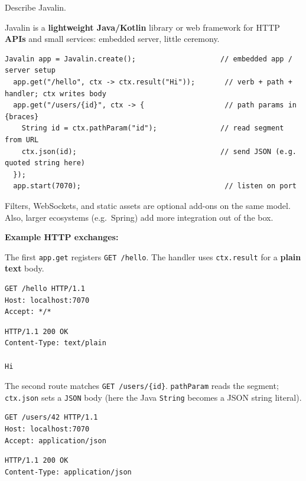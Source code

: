 \question[4]
Describe Javalin.
\begin{solutionorbox}[1.00in]
  Javalin is a \textbf{lightweight Java/Kotlin} library or web framework for HTTP \textbf{APIs} and small services: embedded server, little ceremony.

  \begin{lstlisting}[style=java]
  Javalin app = Javalin.create();                    // embedded app / server setup
  app.get("/hello", ctx -> ctx.result("Hi"));       // verb + path + handler; ctx writes body
  app.get("/users/{id}", ctx -> {                   // path params in {braces}
    String id = ctx.pathParam("id");               // read segment from URL
    ctx.json(id);                                  // send JSON (e.g. quoted string here)
  });
  app.start(7070);                                  // listen on port
  \end{lstlisting}
  Filters, WebSockets, and static assets are optional add-ons on the same model. Also, larger ecosystems (e.g.\ Spring) add more integration out of the box. 

  \noindent\textbf{Example HTTP exchanges:}\par
  \noindent The first \texttt{app.get} registers \texttt{GET /hello}. The handler uses \texttt{ctx.result} for a \textbf{plain text} body.\par
  \begin{httpexchange}
\begin{lstlisting}[style=http]
GET /hello HTTP/1.1
Host: localhost:7070
Accept: */*

\end{lstlisting}
\httpmidarrows
\begin{lstlisting}[style=http]
HTTP/1.1 200 OK
Content-Type: text/plain

Hi
\end{lstlisting}
  \end{httpexchange}

  \noindent The second route matches \texttt{GET /users/\{id\}}. \texttt{pathParam} reads the segment; \texttt{ctx.json} sets a \texttt{JSON} body (here the Java \texttt{String} becomes a JSON string literal).\par
  \begin{httpexchange}
\begin{lstlisting}[style=http]
GET /users/42 HTTP/1.1
Host: localhost:7070
Accept: application/json

\end{lstlisting}
\httpmidarrows
\begin{lstlisting}[style=http]
HTTP/1.1 200 OK
Content-Type: application/json


\end{lstlisting}
\end{httpexchange}
\end{solutionorbox}
